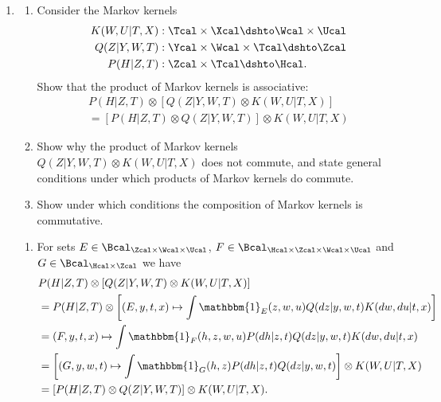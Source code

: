 \begin{enumerate}[label=3.\arabic*]
    \item %
    \begin{enumerate}
        \item
        Consider the Markov kernels
        \begin{align*}
            K(W, U | T, X) & : \Tcal\times \Xcal \dshto \Wcal \times \Ucal  \\
            Q(Z | Y, W, T) & : \Ycal \times \Wcal \times \Tcal \dshto \Zcal \\
            P(H|Z, T)      & : \Zcal \times \Tcal \dshto \Hcal.
        \end{align*}
        Show that the product of Markov kernels is associative:
        \begin{multline*}
            P(H|Z, T) \otimes \left[ Q(Z | Y, W, T) \otimes K(W, U|T, X) \right]\\
            = \left[P(H|Z, T) \otimes  Q(Z | Y, W, T) \right] \otimes K(W, U|T, X)
        \end{multline*}
        \item
        Show why the product of Markov kernels $Q(Z | Y, W, T) \otimes K(W, U|T, X)$ does not commute, and state general conditions under which products of Markov kernels do commute.
        \item Show under which conditions the composition of Markov kernels is commutative.
    \end{enumerate}
    \begin{ungradedsolution}
        \begin{enumerate}
            \item For sets $E\in\Bcal_{\Zcal\times\Wcal \times\Ucal}$, $F\in\Bcal_{\Hcal\times\Zcal\times \Wcal \times \Ucal}$ and $G\in\Bcal_{\Hcal\times\Zcal}$ we have
            \begin{align*}
                 & P(H|Z, T) \otimes \left[ Q(Z | Y, W, T) \otimes K(W, U|T, X) \right]                                              \\
                 & = P(H|Z, T) \otimes \left[(E, y, t, x) \mapsto \int \mathbbm{1}_{E}(z, w, u)Q(dz | y,w, t)K(dw, du| t, x) \right] \\
                 & = (F, y, t, x) \mapsto \int \mathbbm{1}_{F}(h, z, w, u)P(dh|z, t)Q(dz | y,w, t)K(dw, du| t, x)                    \\
                 & = \left[(G, y, w, t) \mapsto \int \mathbbm{1}_{G}(h, z)P(dh|z, t)Q(dz | y,w, t) \right] \otimes K(W, U|T, X)      \\
                 & = \left[P(H|Z, T) \otimes Q(Z | Y, W, T) \right] \otimes K(W, U|T, X).

\end{align*}
\end{enumerate}
\end{ungradedsolution}
\end{enumerate}
